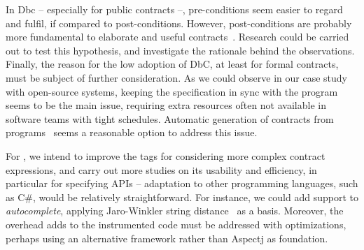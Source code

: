 In Dbc -- especially for public contracts --, pre-conditions seem easier to regard and fulfil, if compared to post-conditions. However, post-conditions are probably more fundamental to elaborate and useful contracts~\cite{Rosenblum}. Research could be carried out to test this hypothesis, and investigate the rationale behind the observations.   
Finally, the reason for the low adoption of DbC, at least for formal contracts, must be subject of further consideration. As we could observe in our case study with open-source systems, keeping the specification in sync with the program seems to be the main issue, requiring extra resources often not available in software teams with tight schedules. Automatic generation of contracts from programs~\cite{docAnalysis,atComment} seems a reasonable option to address this issue.  

For \contractjdoc{}, we intend to improve the tags for considering more complex contract expressions, and carry out more studies on its usability and efficiency, in particular for specifying APIs -- adaptation to other programming languages, such as C\#, would be relatively straightforward. 
For instance, we could add support to \emph{autocomplete}, applying Jaro-Winkler string distance~\cite{jaro,winkler99} as a basis.
Moreover, the overhead \contractjdoc{} adds to the instrumented code must be addressed with optimizations, perhaps using an alternative framework rather than Aspectj as foundation. 















